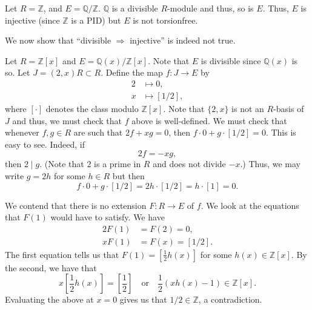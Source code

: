 \begin{ex}
	Let $R = \mathbb{Z}$, and $E = \mathbb{Q}/\mathbb{Z}$. $\mathbb{Q}$ is a divisible $R$-module and thus, so is $E$. Thus, $E$ is injective (since $\mathbb{Z}$ is a PID) but $E$ is not torsionfree.
\end{ex}

\begin{ex} \label{ex:divisible-not-injective}
	We now show that ``divisible $\Rightarrow$ injective'' is indeed not true. 

	Let $R = \mathbb{Z}[x]$ and $E = \mathbb{Q}(x)/\mathbb{Z}[x]$. Note that $E$ is divisible since $\mathbb{Q}(x)$ is so. Let $J = (2, x)R \subset R$. Define the map $f : J \to E$ by
	\begin{align*} 
		2 &\mapsto 0, \\
		x &\mapsto [1/2],
	\end{align*}
	where $[\cdot]$ denotes the class modulo $\mathbb{Z}[x]$. Note that $\{2, x\}$ is not an $R$-basis of $J$ and thus, we must check that $f$ above is well-defined. We must check that whenever $f, g \in R$ are such that $2f + xg = 0$, then $f \cdot 0 + g \cdot [1/2] = 0$. This is easy to see. Indeed, if
	\begin{equation*} 
		2f = -xg,
	\end{equation*}
	then $2 \mid g$. (Note that $2$ is a prime in $R$ and does not divide $-x$.) \newline
	Thus, we may write $g = 2h$ for some $h \in R$ but then
	\begin{equation*} 
		f \cdot 0 + g \cdot [1/2] = 2h \cdot [1/2] = h \cdot [1] = 0.
	\end{equation*}

	We contend that there is no extension $F : R \to E$ of $f$. We look at the equations that $F(1)$ would have to satisfy. We have
	\begin{align*} 
		2 F(1) &= F(2) = 0, \\
		x F(1) &= F(x) = [1/2].
	\end{align*}
	The first equation tells us that $F(1) = [\frac{1}{2} h(x)]$ for some $h(x) \in \mathbb{Z}[x]$. By the second, we have that
	\begin{equation*} 
		x \left[\frac{1}{2}h(x)\right] = \left[\frac{1}{2}\right] \quad\text{or}\quad \frac{1}{2}(xh(x) - 1) \in \mathbb{Z}[x].
	\end{equation*}
	Evaluating the above at $x = 0$ gives us that $1/2 \in \mathbb{Z}$, a contradiction.
\end{ex}

